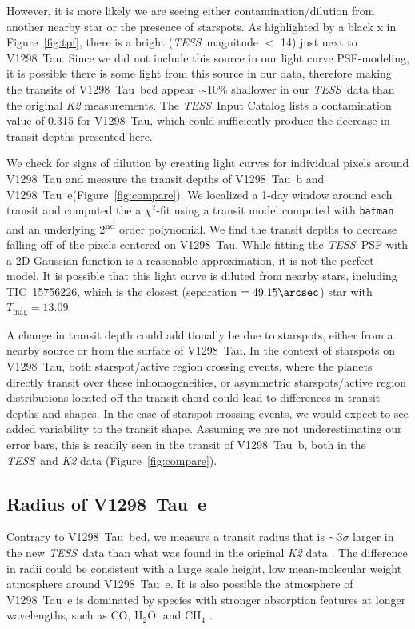 \documentclass[twocolumn]{aastex631}
\newcommand{\tess}{\textit{TESS}}
\newcommand{\sname}{V1298~Tau\xspace}
\newcommand{\planetb}{V1298~Tau~b\xspace}
\newcommand{\planete}{V1298~Tau~e\xspace}
\newcommand{\planetknown}{V1298~Tau~bcd\xspace}
\begin{document}
However, it is more likely we are seeing either contamination/dilution from another nearby star or the presence of starspots. As highlighted by a black x in Figure~\ref{fig:tpf}, there is a bright (\tess\ magnitude $<$ 14) just next to \sname. Since we did not include this source in our light curve PSF-modeling, it is possible there is some light from this source in our data, therefore making the transits of \planetknown appear $\sim 10$\% shallower in our \tess\ data than the original \textit{K2} measurements. The \tess\ Input Catalog \citep{stassun18} lists a contamination value of 0.315 for \sname, which could sufficiently produce the decrease in transit depths presented here. 

We check for signs of dilution by creating light curves for individual pixels around \sname and measure the transit depths of \planetb and \planete (Figure~\ref{fig:compare}). We localized a 1-day window around each transit and computed the a $\chi^2$-fit using a transit model computed with \texttt{batman} \citep{Kreidberg15} and an underlying 2\textsuperscript{nd} order polynomial. We find the transit depths to decrease falling off of the pixels centered on \sname. While fitting the \tess\ PSF with a 2D Gaussian function is a reasonable approximation, it is not the perfect model. It is possible that this light curve is diluted from nearby stars, including TIC~15756226, which is the closest (separation $= 49.15\arcsec$) star with $T_\textrm{mag} = 13.09$.

A change in transit depth could additionally be due to starspots, either from a nearby source or from the surface of \sname. In the context of starspots on \sname, both starspot/active region crossing events, where the planets directly transit over these inhomogeneities, or asymmetric starspots/active region distributions located off the transit chord could lead to differences in transit depths and shapes. In the case of starspot crossing events, we would expect to see added variability to the transit shape. Assuming we are not underestimating our error bars, this is readily seen in the transit of \planetb, both in the \tess\ and \textit{K2} data (Figure~\ref{fig:compare}). 


\subsection{Radius of \planete}

Contrary to \planetknown, we measure a transit radius that is $\sim 3\sigma$ larger in the new \tess\ data than what was found in the original \textit{K2} data \citep{David2019a}. The difference in radii could be consistent with a large scale height, low mean-molecular weight atmosphere around \planete \citep{deMooij12}. It is also possible the atmosphere of \planete is dominated by species with stronger absorption features at longer wavelengths, such as CO, H$_2$O, and CH$_4$ \citep{carter09}. 
\end{document}
